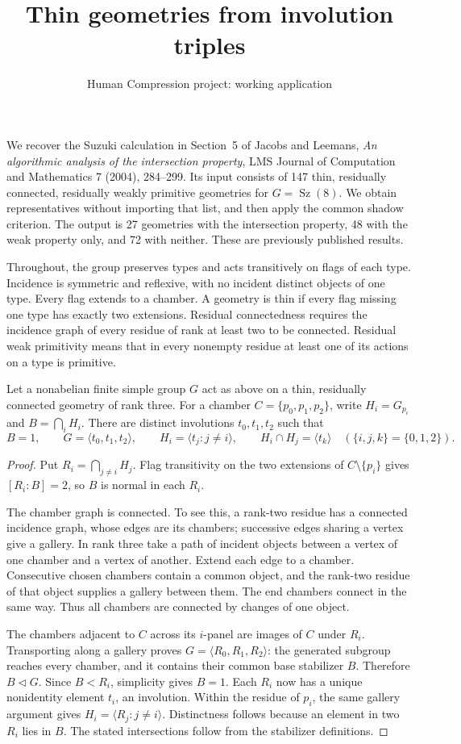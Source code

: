 \documentclass[11pt,a4paper]{article}
\title{Thin geometries from involution triples}
\author{Human Compression project: working application}\date{}
\begin{document}
\maketitle
We recover the Suzuki calculation in Section~5 of Jacobs and Leemans,
\emph{An algorithmic analysis of the intersection property}, LMS Journal
of Computation and Mathematics 7 (2004), 284--299. Its input consists of
147 thin, residually connected, residually weakly primitive geometries for
$G=\operatorname{Sz}(8)$. We obtain representatives without importing that
list, and then apply the common shadow criterion. The output is 27 geometries
with the intersection property, 48 with the weak property only, and 72
with neither. These are previously published results.

Throughout, the group preserves types and acts transitively on flags of
each type. Incidence is symmetric and reflexive, with no incident distinct
objects of one type. Every flag extends to a chamber. A geometry is thin
if every flag missing one type has exactly two extensions. Residual
connectedness requires the incidence graph of every residue of rank at
least two to be connected. Residual weak primitivity means that in every
nonempty residue at least one of its actions on a type is primitive.

\begin{lemma}\label{thin}
Let a nonabelian finite simple group $G$ act as above on a thin, residually
connected geometry of rank three. For a chamber $C=\{p_0,p_1,p_2\}$,
write $H_i=G_{p_i}$ and $B=\bigcap_i H_i$. There are distinct involutions
$t_0,t_1,t_2$ such that
\[
 B=1,\qquad G=\langle t_0,t_1,t_2\rangle,\qquad
 H_i=\langle t_j:j\ne i\rangle,
 \qquad H_i\cap H_j=\langle t_k\rangle\quad(\{i,j,k\}=\{0,1,2\}).
\]
\end{lemma}
\begin{proof}
Put $R_i=\bigcap_{j\ne i}H_j$. Flag transitivity on the two extensions
of $C\setminus\{p_i\}$ gives $[R_i:B]=2$, so $B$ is normal in each $R_i$.

The chamber graph is connected. To see this, a rank-two residue has a
connected incidence graph, whose edges are its chambers; successive edges
sharing a vertex give a gallery. In rank three take a path of incident
objects between a vertex of one chamber and a vertex of another. Extend
each edge to a chamber. Consecutive chosen chambers contain a common
object, and the rank-two residue of that object supplies a gallery between
them. The end chambers connect in the same way. Thus all chambers are
connected by changes of one object.

The chambers adjacent to $C$ across its $i$-panel are images of $C$ under
$R_i$. Transporting along a gallery proves
$G=\langle R_0,R_1,R_2\rangle$: the generated subgroup reaches every
chamber, and it contains their common base stabilizer $B$. Therefore
$B\lhd G$. Since $B<R_i$, simplicity gives $B=1$. Each $R_i$ now has a
unique nonidentity element $t_i$, an involution. Within the residue of
$p_i$, the same gallery argument gives
$H_i=\langle R_j:j\ne i\rangle$. Distinctness follows because an element
in two $R_i$ lies in $B$. The stated intersections follow from the
stabilizer definitions.
\end{proof}
\end{document}

